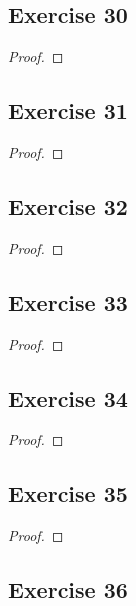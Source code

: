 \documentclass[14pt]{extarticle}
\begin{document}
\subsection{Exercise 30}

\begin{proof}

\end{proof}

\subsection{Exercise 31}

\begin{proof}

\end{proof}

\subsection{Exercise 32}

\begin{proof}

\end{proof}

\subsection{Exercise 33}

\begin{proof}

\end{proof}

\subsection{Exercise 34}

\begin{proof}

\end{proof}

\subsection{Exercise 35}

\begin{proof}

\end{proof}

\subsection{Exercise 36}
\end{document}
